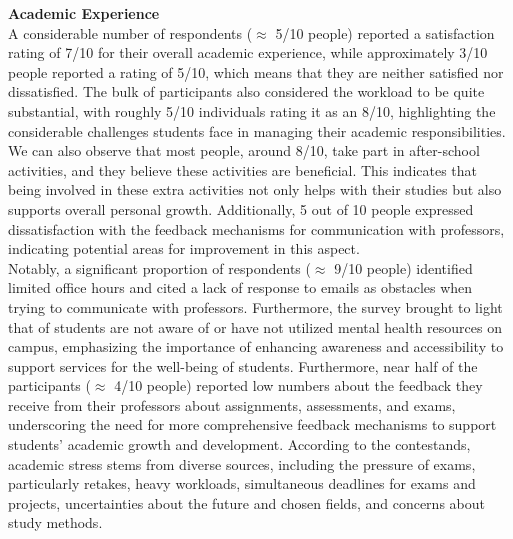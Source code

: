 \noindent \textbf{Academic Experience} \\
A considerable number of respondents ($\approx$ 5/10 people) reported a satisfaction rating of 7/10 for their overall academic experience, while approximately 3/10 people reported a rating of 5/10, which means that they are neither satisfied nor dissatisfied. The bulk of participants also considered the workload to be quite substantial, with roughly 5/10 individuals rating it as an 8/10, highlighting the considerable challenges students face in managing their academic responsibilities. We can also observe that most people, around 8/10, take part in after-school activities, and they believe these activities are beneficial. This indicates that being involved in these extra activities not only helps with their studies but also supports overall personal growth. Additionally, 5 out of 10 people expressed dissatisfaction with the feedback mechanisms for communication with professors, indicating potential areas for improvement in this aspect.\vspace{5mm} \\
Notably, a significant proportion of respondents ($\approx$ 9/10 people) identified limited office hours and cited a lack of response to emails as obstacles when trying to communicate with professors. Furthermore, the survey brought to light that  of students are not aware of or have not utilized mental health resources on campus, emphasizing the importance of enhancing awareness and accessibility to support services for the well-being of students. Furthermore, near half of the participants ($\approx$ 4/10 people) reported low numbers about the feedback they receive from their professors about assignments, assessments, and exams, underscoring the need for more comprehensive feedback mechanisms to support students' academic growth and development. According to the contestands, academic stress stems from diverse sources, including the pressure of exams, particularly retakes, heavy workloads, simultaneous deadlines for exams and projects, uncertainties about the future and chosen fields, and concerns about study methods.

\vspace{5mm}

